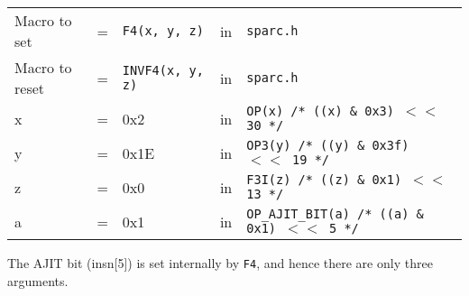 \begin{enumerate}
  \begin{tabular}[h]{lclcl}
    Macro to set  &=& \texttt{F4(x, y, z)} &in& \texttt{sparc.h}     \\
    Macro to reset  &=& \texttt{INVF4(x, y, z)} &in& \texttt{sparc.h}     \\
    x &=& 0x2      &in& \texttt{OP(x)  /* ((x) \& 0x3)  $<<$ 30 */} \\
    y &=& 0x1E     &in& \texttt{OP3(y) /* ((y) \& 0x3f) $<<$ 19 */} \\
    z &=& 0x0      &in& \texttt{F3I(z) /* ((z) \& 0x1)  $<<$ 13 */} \\
    a &=& 0x1      &in& \texttt{OP\_AJIT\_BIT(a) /* ((a) \& 0x1)  $<<$ 5 */}
  \end{tabular}

  The AJIT bit  (insn[5]) is set internally by  \texttt{F4}, and hence
  there are only three arguments.


\end{enumerate}
